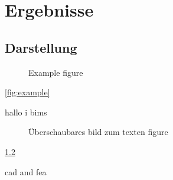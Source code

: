 
\chapter{Ergebnisse}
\section{Darstellung}
\begin{figure}[ht]
  \centering
  \caption{Example figure}
  \label{fig:example3} %
\end{figure}

\cref{fig:example}

hallo i bims

\begin{figure}[ht]
  \centering
  \caption{Überschaubares bild zum texten figure}
  \label{fig:example4} %
\end{figure}

\cref{fig:example4}

\ac{cad}
and \ac{fea}